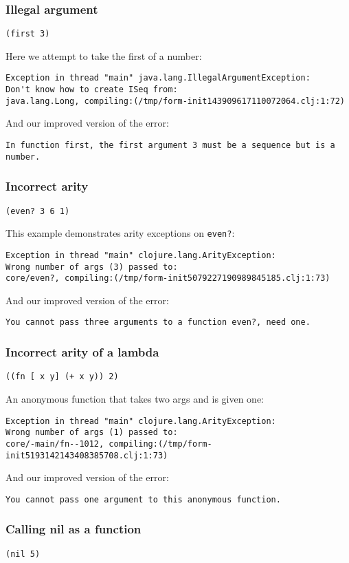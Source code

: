 \documentclass[submission,copyright,creativecommons]{eptcs}
\begin{document}
\subsubsection{Illegal argument}
{\tt (first 3)}

Here we attempt to take the first of a number:
\begin{verbatim}
Exception in thread "main" java.lang.IllegalArgumentException:
Don't know how to create ISeq from:
java.lang.Long, compiling:(/tmp/form-init143909617110072064.clj:1:72)
\end{verbatim}


And our improved version of the error:
\begin{verbatim}
In function first, the first argument 3 must be a sequence but is a number.
\end{verbatim}

\subsubsection{Incorrect arity}
{\tt (even? 3 6 1)}

This example demonstrates arity exceptions on \texttt{even?}:
\begin{verbatim}
Exception in thread "main" clojure.lang.ArityException:
Wrong number of args (3) passed to:
core/even?, compiling:(/tmp/form-init5079227190989845185.clj:1:73)
\end{verbatim}
And our improved version of the error:
\begin{verbatim}
You cannot pass three arguments to a function even?, need one.
\end{verbatim}

\subsubsection{Incorrect arity of a lambda}
{\tt ((fn [ x y] (+ x y)) 2)}

An anonymous function that takes two args and is given one:
\begin{verbatim}
Exception in thread "main" clojure.lang.ArityException:
Wrong number of args (1) passed to: 
core/-main/fn--1012, compiling:(/tmp/form-init5193142143408385708.clj:1:73)
\end{verbatim}
And our improved version of the error:
\begin{verbatim}
You cannot pass one argument to this anonymous function.
\end{verbatim}

\subsubsection{Calling nil as a function}
{\tt (nil 5)}
\end{document}
